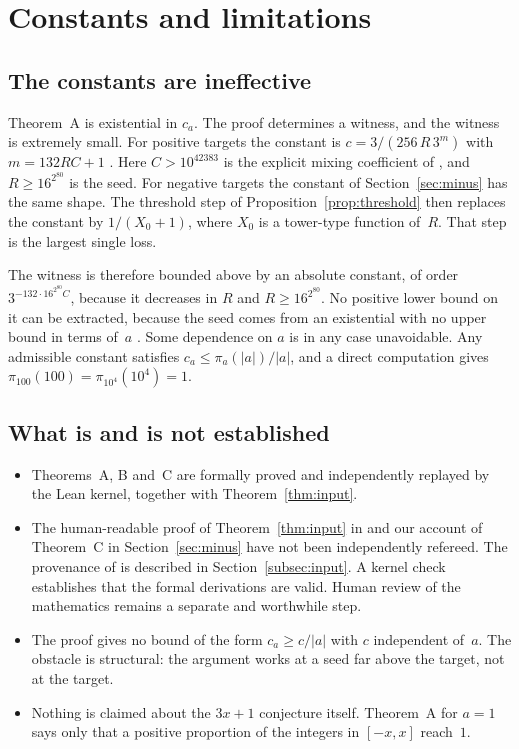\documentclass[11pt]{amsart}
\theoremstyle{definition}
\theoremstyle{remark}
\begin{document}
\section{Constants and limitations}\label{sec:limits}

\subsection{The constants are ineffective}
Theorem~A is existential in $c_a$. The proof determines a witness, and the witness is extremely
small. For positive targets the constant is $c=3/(256\,R\,3^{m})$ with $m=132RC+1$
\cite[(4.3), (4.6)]{MazurM2}. Here $C>10^{42383}$ is the explicit mixing coefficient of
\cite[Lemma~8.1]{MazurM1}, and $R\ge16^{2^{80}}$ is the seed. For negative targets the constant of
Section~\ref{sec:minus} has the same shape. The threshold step of Proposition~\ref{prop:threshold}
then replaces the constant by $1/(X_0+1)$, where $X_0$ is a tower-type function of~$R$. That step is
the largest single loss.

The witness is therefore bounded above by an absolute constant, of order $3^{-132\cdot16^{2^{80}}C}$,
because it decreases in $R$ and $R\ge16^{2^{80}}$. No positive lower bound on it can be extracted,
because the seed comes from an existential with no upper bound in terms of~$a$
\cite[Remark~4.3]{MazurM2}. Some dependence on $a$ is in any case unavoidable. Any admissible
constant satisfies $c_a\le\pi_a(|a|)/|a|$, and a direct computation gives
$\pi_{100}(100)=\pi_{10^4}(10^4)=1$.

\subsection{What is and is not established}
\begin{itemize}[leftmargin=*]
\item Theorems~A, B and~C are formally proved and independently replayed by the Lean kernel,
  together with Theorem~\ref{thm:input}.
\item The human-readable proof of Theorem~\ref{thm:input} in \cite{MazurM1,MazurM2} and our account of
  Theorem~C in Section~\ref{sec:minus} have not been independently refereed. The provenance of
  \cite{MazurM1,MazurM2} is described in Section~\ref{subsec:input}. A kernel
  check establishes that the formal derivations are valid. Human review of the mathematics remains
  a separate and worthwhile step.
\item The proof gives no bound of the form $c_a\ge c/|a|$ with $c$ independent of~$a$. The obstacle
  is structural: the argument works at a seed far above the target, not at the target.
\item Nothing is claimed about the $3x+1$ conjecture itself. Theorem~A for $a=1$ says only that a
  positive proportion of the integers in $[-x,x]$ reach~$1$.
\end{itemize}
\end{document}
